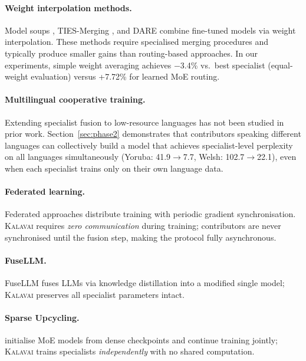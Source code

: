 \documentclass{article}
\newcommand{\kalavai}{\textsc{Kalavai}\xspace}
\begin{document}
\paragraph{Weight interpolation methods.} Model soups \citep{wortsman2022modelsoups}, TIES-Merging \citep{yadav2023tiesmerging}, and DARE \citep{yu2023dare} combine fine-tuned models via weight interpolation. These methods require specialised merging procedures and typically produce smaller gains than routing-based approaches. In our experiments, simple weight averaging achieves $-$3.4\% vs.\ best specialist (equal-weight evaluation) versus +7.72\% for learned MoE routing.

\paragraph{Multilingual cooperative training.} Extending specialist fusion to low-resource languages has not been studied in prior work. Section~\ref{sec:phase2} demonstrates that contributors speaking different languages can collectively build a model that achieves specialist-level perplexity on all languages simultaneously (Yoruba: 41.9$\to$7.7, Welsh: 102.7$\to$22.1), even when each specialist trains only on their own language data.

\paragraph{Federated learning.} Federated approaches \citep{mcmahan2017federated} distribute training with periodic gradient synchronisation. \kalavai requires \emph{zero communication} during training; contributors are never synchronised until the fusion step, making the protocol fully asynchronous.

\paragraph{FuseLLM.} FuseLLM \citep{wan2024fusellm} fuses LLMs via knowledge distillation into a modified single model; \kalavai preserves all specialist parameters intact.

\paragraph{Sparse Upcycling.} \citet{komatsuzaki2023sparseupcycling} initialise MoE models from dense checkpoints and continue training jointly; \kalavai trains specialists \emph{independently} with no shared computation.
\end{document}
